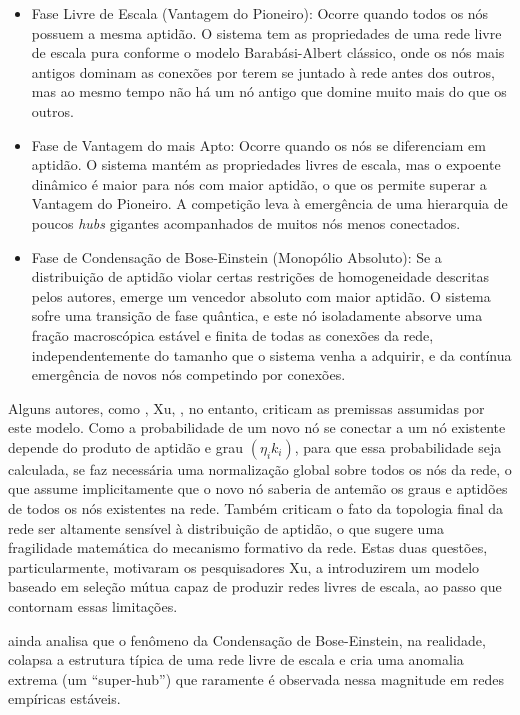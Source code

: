 \documentclass[12pt,oneside,a4paper,brazil,sumario=tradicional]{abntex2}
\begin{document}
\begin{itemize}
  \item Fase Livre de Escala (Vantagem do Pioneiro): Ocorre quando todos os nós possuem a mesma aptidão. O sistema tem as propriedades de uma rede livre de escala pura conforme o modelo Barabási-Albert clássico, onde os nós mais antigos dominam as conexões por terem se juntado à rede antes dos outros, mas ao mesmo tempo não há um nó antigo que domine muito mais do que os outros.
\end{itemize}
\begin{itemize}
  \item Fase de Vantagem do mais Apto: Ocorre quando os nós se diferenciam em aptidão. O sistema mantém as propriedades livres de escala, mas o expoente dinâmico é maior para nós com maior aptidão, o que os permite superar a Vantagem do Pioneiro. A competição leva à emergência de uma hierarquia de poucos \textit{hubs }gigantes acompanhados de muitos nós menos conectados.
  \item Fase de Condensação de Bose-Einstein (Monopólio Absoluto): Se a distribuição de aptidão violar certas restrições de homogeneidade descritas pelos autores, emerge um vencedor absoluto com maior aptidão. O sistema sofre uma transição de fase quântica, e este nó isoladamente absorve uma fração macroscópica estável e finita de todas as conexões da rede, independentemente do tamanho que o sistema venha a adquirir, e da contínua emergência de novos nós competindo por conexões.
\end{itemize}

Alguns autores, como \textcite{newman2003}, Xu, \textcite{xu2010}, no entanto, criticam as premissas assumidas por este modelo. Como a probabilidade de um novo nó se conectar a um nó existente depende do produto de aptidão e grau $(\eta_{i}k_{i})$, para que essa probabilidade seja calculada, se faz necessária uma normalização global sobre todos os nós da rede, o que assume implicitamente que o novo nó saberia de antemão os graus e aptidões de todos os nós existentes na rede.  Também criticam o fato da topologia final da rede ser altamente sensível à distribuição de aptidão, o que sugere uma fragilidade matemática do mecanismo formativo da rede. Estas duas questões, particularmente, motivaram os pesquisadores Xu, \textcite{xu2010} a introduzirem um modelo baseado em seleção mútua capaz de produzir redes livres de escala, ao passo que contornam essas limitações.

\textcite{newman2003} ainda analisa que o fenômeno da Condensação de Bose-Einstein, na realidade, colapsa a estrutura típica de uma rede livre de escala e cria uma anomalia extrema (um “super-hub”) que raramente é observada nessa magnitude em redes empíricas estáveis.
\end{document}
